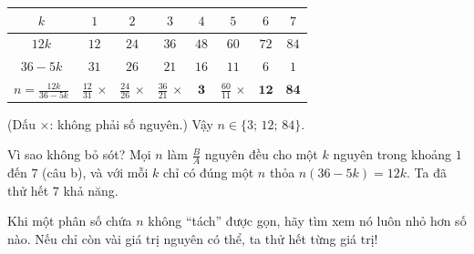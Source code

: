 {
\begin{center}
\begin{tabular}{|c|c|c|c|c|c|c|c|}
\hline
\rowcolor{tmBlue!10}$k$ & $1$ & $2$ & $3$ & $4$ & $5$ & $6$ & $7$\\ \hline
$12k$ & $12$ & $24$ & $36$ & $48$ & $60$ & $72$ & $84$\\ \hline
$36-5k$ & $31$ & $26$ & $21$ & $16$ & $11$ & $6$ & $1$\\ \hline
$n=\frac{12k}{36-5k}$ & $\frac{12}{31}$ $\times$ & $\frac{24}{26}$ $\times$ & $\frac{36}{21}$ $\times$ & $\mathbf{3}$ & $\frac{60}{11}$ $\times$ & $\mathbf{12}$ & $\mathbf{84}$\\ \hline
\end{tabular}
\end{center}
(Dấu $\times$: không phải số nguyên.)
Vậy $n\in\{3;\,12;\,84\}$.
\begin{proofbox}Vì sao không bỏ sót? Mọi $n$ làm $\frac{B}{A}$ nguyên đều cho một $k$ nguyên trong khoảng $1$ đến $7$ (câu b), và với mỗi $k$ chỉ có đúng một $n$ thỏa $n(36-5k)=12k$. Ta đã thử hết $7$ khả năng.\end{proofbox}
\begin{tipbox}Khi một phân số chứa $n$ không ``tách'' được gọn, hãy tìm xem nó luôn nhỏ hơn số nào. Nếu chỉ còn vài giá trị nguyên có thể, ta thử hết từng giá trị!\end{tipbox}
}

